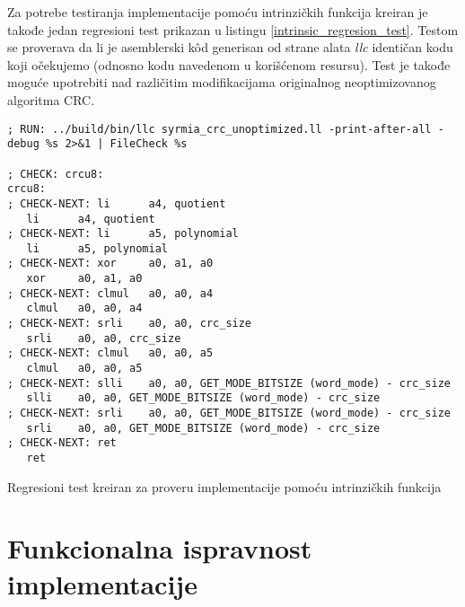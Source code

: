 \documentclass[12pt,oneside]{memoir}
\begin{document}
Za potrebe testiranja implementacije pomoću intrinzičkih funkcija kreiran je takođe jedan regresioni test prikazan u listingu \ref{intrinsic_regresion_test}.
Testom se proverava da li je asemblerski k\^od generisan od strane alata \textit{llc} identičan kodu koji očekujemo (odnosno kodu navedenom u korišćenom resursu). Test je takođe moguće upotrebiti nad različitim modifikacijama originalnog neoptimizovanog algoritma CRC.

\begin{listing}[!ht]
\begin{verbatim}
; RUN: ../build/bin/llc syrmia_crc_unoptimized.ll -print-after-all -debug %s 2>&1 | FileCheck %s

; CHECK: crcu8: 
crcu8:  
; CHECK-NEXT: li      a4, quotient
   li      a4, quotient
; CHECK-NEXT: li      a5, polynomial
   li      a5, polynomial
; CHECK-NEXT: xor     a0, a1, a0
   xor     a0, a1, a0
; CHECK-NEXT: clmul   a0, a0, a4
   clmul   a0, a0, a4
; CHECK-NEXT: srli    a0, a0, crc_size
   srli    a0, a0, crc_size
; CHECK-NEXT: clmul   a0, a0, a5
   clmul   a0, a0, a5
; CHECK-NEXT: slli    a0, a0, GET_MODE_BITSIZE (word_mode) - crc_size
   slli    a0, a0, GET_MODE_BITSIZE (word_mode) - crc_size
; CHECK-NEXT: srli    a0, a0, GET_MODE_BITSIZE (word_mode) - crc_size
   srli    a0, a0, GET_MODE_BITSIZE (word_mode) - crc_size
; CHECK-NEXT: ret
   ret
\end{verbatim}
\caption{Regresioni test kreiran za proveru implementacije pomoću intrinzičkih funkcija}
\label{intrinsic_regresion_test}
\centering
\end{listing}

\section{Funkcionalna ispravnost implementacije}
\label{sec:rez_evaluacije}

\end{document}
